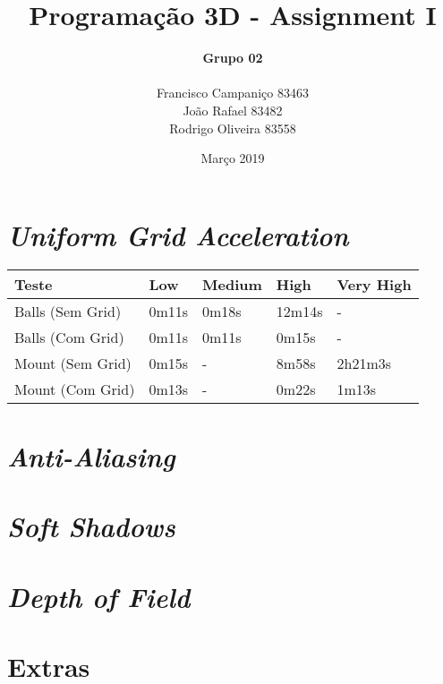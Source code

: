 \documentclass{article}
\title{
    \textbf{Programação 3D - Assignment I}
    }
\author{
    \begin{Large}
        \textbf{Grupo 02}
    \end{Large}\\
    Francisco Campaniço 83463\\
    João Rafael 83482\\
    Rodrigo Oliveira 83558
}
\date{Março 2019}
\begin{document}
    \maketitle

    \section*{\textit{Uniform Grid Acceleration}}
        \par
        \begin{table}[h]
            \centering
            \begin{tabular}{|l|l|l|l|l|}
                \hline
                Teste & Low     & Medium    & High     & Very High \\ \hline
                Balls (Sem Grid) & 0m11s   & 0m18s     & 12m14s   & -         \\ \hline
                Balls (Com Grid) & 0m11s   & 0m11s     & 0m15s   & -         \\ \hline
                Mount (Sem Grid) & 0m15s   & -         & 8m58s    & 2h21m3s   \\ \hline
                Mount (Com Grid) & 0m13s   & -         & 0m22s    & 1m13s   \\ \hline
            \end{tabular}
        \end{table}

    \section*{\textit{Anti-Aliasing}}
        \par


    \section*{\textit{Soft Shadows}}
        \par

        
    \section*{\textit{Depth of Field}}
        \par

    \section*{Extras}        
\end{document}
